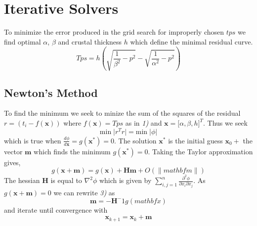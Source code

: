 \documentclass[a4paper,12pt]{article}
\begin{document}
\section{Iterative Solvers}

To minimize the error produced in the grid search for improperly chosen
$tps$ we find optimal $\alpha$, $\beta$ and crustal thickness $h$ which
define the minimal residual curve. 
\begin{equation}
Tps = h \left( \sqrt{ \frac{1}{\beta^2} - p^2} - \sqrt{ \frac{1}{\alpha^2} - p^2} \right)
\end{equation}

\subsection{Newton's Method}
To find the minimum we seek to minize the sum of the squares of the residual $r=(t_i - f(\mathbf{x}))$ 
where $f(\mathbf{x}) = Tps$ as in \emph{1)} and $\mathbf{x} = \lbrack \alpha,\beta,h \rbrack^T$.
Thus we seek 
\begin{equation}
\mbox{min}\; \vert r^Tr \vert = \mbox{min}\; \vert \phi \vert
\end{equation}
which is true when $\frac{d\phi}{d\mathbf{x}} = g(\mathbf{x}^*) = 0 $. The solution 
$\mathbf{x}^*$ is the initial guess $\mathbf{x}_0 +$ the vector $\mathbf{m} $ which 
finds the minimum $g(\mathbf{x}^*) = 0$. Taking the Taylor approximation gives,
\begin{equation}
g(\mathbf{x}+\mathbf{m}) = g(\mathbf{x}) + \mathbf{Hm} + O(\|mathbf{m}\|)
\end{equation}
The hessian $\mathbf{H}$ is equal to $\nabla^2\phi$ which is given by
$\sum_{i,j=1}^{n} \frac{\partial^2 \phi}{\partial x_i \partial x_j}$. As 
$g(\mathbf{x}+\mathbf{m})=0$ we can rewrite \emph{3)} as
\begin{equation}
\mathbf{m}=-\mathbf{H}^-1g(mathbf{x})
\end{equation}
and iterate until convergence with
\begin{equation}
\mathbf{x}_{k+1} = \mathbf{x}_k + \mathbf{m}
\end{equation}
\end{document}
